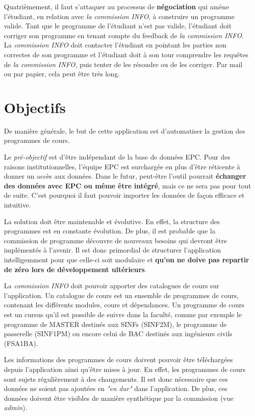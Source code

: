Quatrièmement, il faut s'attaquer au processus de \textbf{négociation} qui amène l'étudiant, en relation avec \textit{la commission INFO}, à construire un programme valide. Tant que le programme de l'étudiant n'est pas valide, l'étudiant doit corriger son programme en tenant compte du feedback de \textit{la commission INFO}. La \textit{commission INFO} doit contacter l'étudiant en pointant les parties non correctes de son programme et l'étudiant doit à son tour comprendre les requêtes de \textit{la commission INFO}, puis tenter de les résoudre ou de les corriger. Par mail ou par papier, cela peut être très long. 
\clearpage


\section{Objectifs}
De manière générale, le but de cette application est d'automatiser la gestion des programmes de cours. 


Le \textit{pré-objectif} est d'être indépendant de la base de données EPC. Pour des raisons institutionnelles, l'équipe EPC est surchargée en plus d'être réticente à donner un accès aux données. Dans le futur, peut-être l'outil pourrait \textbf{échanger des données avec EPC ou même être intégré}, mais ce ne sera pas pour tout de suite. C'est pourquoi il faut pouvoir importer les données de façon efficace et intuitive.
 
La solution doit être maintenable et évolutive. En effet, la structure des programmes est en constante évolution. De plus, il est probable que la commission de programme découvre de nouveaux besoins qui devront être implémentés à l'avenir. Il est donc primordial de structurer l'application intelligemment pour que celle-ci soit modulaire et \textbf{qu'on ne doive pas repartir de zéro lors de développement ultérieurs}.

La \textit{commission INFO} doit pouvoir apporter des catalogues de cours sur l'application. Un catalogue de cours est un ensemble de programmes de cours, contenant les différents modules, cours et dépendances. Un programme de cours est un cursus qu'il est possible de suivre dans la faculté, comme par exemple le programme de MASTER destinés aux SINFs (SINF2M), le programme de passerelle (SINF1PM) ou encore celui de BAC destinés aux ingénieurs civils (FSA1BA).  

Les informations des programmes de cours  doivent pouvoir être téléchargées depuis l'application ainsi qu'être mises à jour. En effet, les programmes de cours sont sujets régulièrement à des changements. Il est donc nécessaire que ces données ne soient pas ajoutées en \textit{"en dur"} dans l'application. De plus, ces données doivent être visibles de manière synthétique par la commission (vue \textit{admin}).

